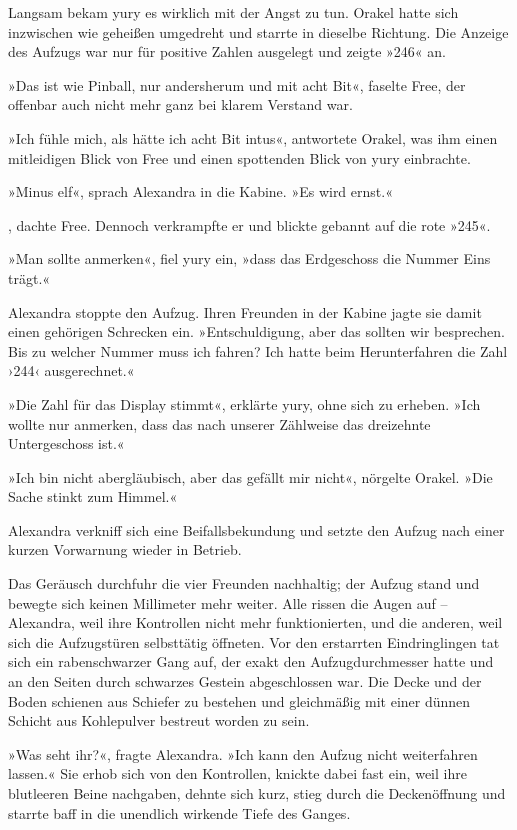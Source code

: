 Langsam bekam yury es wirklich mit der Angst zu tun. Orakel hatte sich inzwischen wie geheißen umgedreht und starrte in dieselbe Richtung. Die Anzeige des Aufzugs war nur für positive Zahlen ausgelegt und zeigte »246« an.

»Das ist wie Pinball, nur andersherum und mit acht Bit«, faselte Free, der offenbar auch nicht mehr ganz bei klarem Verstand war.

»Ich fühle mich, als hätte ich acht Bit intus«, antwortete Orakel, was ihm einen mitleidigen Blick von Free und einen spottenden Blick von yury einbrachte.

»Minus elf«, sprach Alexandra in die Kabine. »Es wird ernst.«

, dachte Free. Dennoch verkrampfte er und blickte gebannt auf die rote »245«.

»Man sollte anmerken«, fiel yury ein, »dass das Erdgeschoss die Nummer Eins trägt.«

Alexandra stoppte den Aufzug. Ihren Freunden in der Kabine jagte sie damit einen gehörigen Schrecken ein. »Entschuldigung, aber das sollten wir besprechen. Bis zu welcher Nummer muss ich fahren? Ich hatte beim Herunterfahren die Zahl ›244‹ ausgerechnet.«

»Die Zahl für das Display stimmt«, erklärte yury, ohne sich zu erheben. »Ich wollte nur anmerken, dass das nach unserer Zählweise das dreizehnte Untergeschoss ist.«

»Ich bin nicht abergläubisch, aber das gefällt mir nicht«, nörgelte Orakel. »Die Sache stinkt zum Himmel.«

Alexandra verkniff sich eine Beifallsbekundung und setzte den Aufzug nach einer kurzen Vorwarnung wieder in Betrieb.


Das Geräusch durchfuhr die vier Freunden nachhaltig; der Aufzug stand und bewegte sich keinen Millimeter mehr weiter. Alle rissen die Augen auf – Alexandra, weil ihre Kontrollen nicht mehr funktionierten, und die anderen, weil sich die Aufzugstüren selbsttätig öffneten. Vor den erstarrten Eindringlingen tat sich ein rabenschwarzer Gang auf, der exakt den Aufzugdurchmesser hatte und an den Seiten durch schwarzes Gestein abgeschlossen war. Die Decke und der Boden schienen aus Schiefer zu bestehen und gleichmäßig mit einer dünnen Schicht aus Kohlepulver bestreut worden zu sein.

»Was seht ihr?«, fragte Alexandra. »Ich kann den Aufzug nicht weiterfahren lassen.« Sie erhob sich von den Kontrollen, knickte dabei fast ein, weil ihre blutleeren Beine nachgaben, dehnte sich kurz, stieg durch die Deckenöffnung und starrte baff in die unendlich wirkende Tiefe des Ganges.

